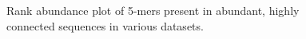 \documentclass[10pt]{article}
\begin{document}
\begin{figure}
\caption{Rank abundance plot of 5-mers present in abundant, highly connected sequences in various datasets.}
\end{figure}
\end{document}
